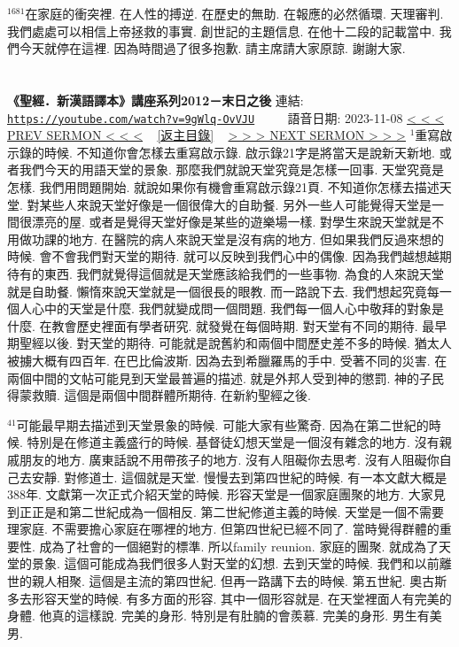 \documentclass{book}
\begin{document}
$^{1681}$在家庭的衝突裡.
在人性的搏逆.
在歷史的無助.
在報應的必然循環.
天理審判.
我們處處可以相信上帝拯救的事實.
創世記的主題信息.
在他十二段的記載當中.
我們今天就停在這裡.
因為時間過了很多抱歉.
請主席請大家原諒.
謝謝大家.
\newpage



\section{}
\label{sec:9gWlq_OvVJU}
\textbf{《聖經．新漢語譯本》講座系列2012－末日之後}
\newline
\newline
連結: \href{https://youtube.com/watch?v=9gWlq-OvVJU}{\texttt{https://youtube.com/watch?v=9gWlq-OvVJU}} ~~~~ 語音日期: 2023-11-08
\newline
\newline
\hyperref[sec:ok3V257cOIA]{\small{< < < PREV SERMON < < <}}
~
\hyperref[sec:index]{\small{[返主目錄]}}
~
\hyperref[sec:L7Klx5S64nM]{\small{> > > NEXT SERMON > > >}}
\newline
\newline
$^{1}$重寫啟示錄的時候.
不知道你會怎樣去重寫啟示錄.
啟示錄21字是將當天是說新天新地.
或者我們今天的用語天堂的景象.
那麼我們就說天堂究竟是怎樣一回事.
天堂究竟是怎樣.
我們用問題開始.
就說如果你有機會重寫啟示錄21頁.
不知道你怎樣去描述天堂.
對某些人來說天堂好像是一個很偉大的自助餐.
另外一些人可能覺得天堂是一間很漂亮的屋.
或者是覺得天堂好像是某些的遊樂場一樣.
對學生來說天堂就是不用做功課的地方.
在醫院的病人來說天堂是沒有病的地方.
但如果我們反過來想的時候.
會不會我們對天堂的期待.
就可以反映到我們心中的偶像.
因為我們越想越期待有的東西.
我們就覺得這個就是天堂應該給我們的一些事物.
為食的人來說天堂就是自助餐.
懶惰來說天堂就是一個很長的眼教.
而一路說下去.
我們想起究竟每一個人心中的天堂是什麼.
我們就變成問一個問題.
我們每一個人心中敬拜的對象是什麼.
在教會歷史裡面有學者研究.
就發覺在每個時期.
對天堂有不同的期待.
最早期聖經以後.
對天堂的期待.
可能就是說舊約和兩個中間歷史差不多的時候.
猶太人被擄大概有四百年.
在巴比倫波斯.
因為去到希臘羅馬的手中.
受著不同的災害.
在兩個中間的文帖可能見到天堂最普遍的描述.
就是外邦人受到神的懲罰.
神的子民得蒙救贖.
這個是兩個中間群體所期待.
在新約聖經之後.

$^{41}$可能最早期去描述到天堂景象的時候.
可能大家有些驚奇.
因為在第二世紀的時候.
特別是在修道主義盛行的時候.
基督徒幻想天堂是一個沒有雜念的地方.
沒有親戚朋友的地方.
廣東話說不用帶孩子的地方.
沒有人阻礙你去思考.
沒有人阻礙你自己去安靜.
對修道士.
這個就是天堂.
慢慢去到第四世紀的時候.
有一本文獻大概是388年.
文獻第一次正式介紹天堂的時候.
形容天堂是一個家庭團聚的地方.
大家見到正正是和第二世紀成為一個相反.
第二世紀修道主義的時候.
天堂是一個不需要理家庭.
不需要擔心家庭在哪裡的地方.
但第四世紀已經不同了.
當時覺得群體的重要性.
成為了社會的一個絕對的標準.
所以family reunion.
家庭的團聚.
就成為了天堂的景象.
這個可能成為我們很多人對天堂的幻想.
去到天堂的時候.
我們和以前離世的親人相聚.
這個是主流的第四世紀.
但再一路講下去的時候.
第五世紀.
奧古斯多去形容天堂的時候.
有多方面的形容.
其中一個形容就是.
在天堂裡面人有完美的身體.
他真的這樣說.
完美的身形.
特別是有肚腩的會羨慕.
完美的身形.
男生有美男.
\end{document}
